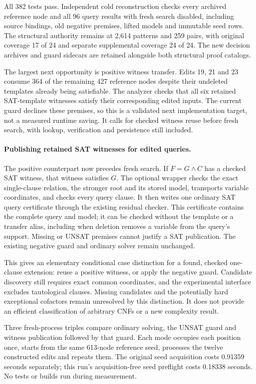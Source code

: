 \documentclass[11pt,a4paper]{article}
\numberwithin{equation}{section}
\theoremstyle{plain}
\theoremstyle{definition}
\theoremstyle{remark}
\begin{document}
All 382 tests pass. Independent cold reconstruction checks every archived
reference node and all 96 query results with fresh search disabled, including
source bindings, old negative premises, lifted models and immutable seed rows.
The structural authority remains at 2,614 patterns and 259 pairs, with original
coverage 17 of 24 and separate supplemental coverage 24 of 24. The new decision
archives and guard sidecars are retained alongside both structural proof catalogs.

The largest next opportunity is positive witness transfer. Edits 19, 21 and 23
consume 364 of the remaining 427 reference nodes despite their undeleted
templates already being satisfiable. The analyzer checks that all six retained
SAT-template witnesses satisfy their corresponding edited inputs. The current
guard declines these premises, so this is a validated next implementation target,
not a measured runtime saving. It calls for checked witness reuse before fresh
search, with lookup, verification and persistence still included.

\paragraph{Publishing retained SAT witnesses for edited queries.}
The positive counterpart now precedes fresh search. If $F=G\land C$ has a
checked SAT witness, that witness satisfies $G$. The optional wrapper checks
the exact single-clause relation, the stronger root and its stored model,
transports variable coordinates, and checks every query clause. It then writes
one ordinary SAT query certificate through the existing residual checker.
This certificate contains the complete query and model; it can be checked
without the template or a transfer alias, including when deletion removes a
variable from the query's support. Missing or UNSAT premises cannot justify a
SAT publication. The existing negative guard and ordinary solver remain unchanged.

This gives an elementary conditional case distinction for a found, checked
one-clause extension: reuse a positive witness, or apply the negative guard.
Candidate discovery still requires exact common coordinates, and the experimental
interface excludes tautological clauses. Missing candidates and the potentially
hard exceptional cofactors remain unresolved by this distinction. It does not
provide an efficient classification of arbitrary CNFs or a new complexity result.

Three fresh-process triples compare ordinary solving, the UNSAT guard and
witness publication followed by that guard. Each mode occupies each position
once, starts from the same 613-node reference seed, processes the twelve
constructed edits and repeats them. The original seed acquisition costs
0.91359 seconds separately; this run's acquisition-free seed preflight costs
0.18338 seconds. No tests or builds run during measurement.
\end{document}
